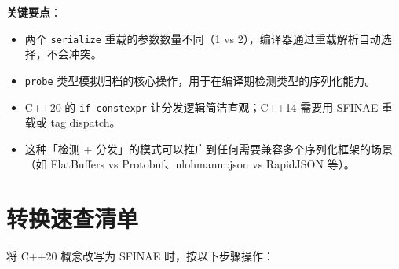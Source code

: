 \documentclass[12pt,a4paper,fontset=fandol]{ctexbook}
\begin{document}
\textbf{关键要点}：
\begin{itemize}[nosep]
  \item 两个 \texttt{serialize} 重载的参数数量不同（1 vs 2），编译器通过重载解析自动选择，不会冲突。
  \item \texttt{probe} 类型模拟归档的核心操作，用于在编译期检测类型的序列化能力。
  \item C++20 的 \texttt{if constexpr} 让分发逻辑简洁直观；C++14 需要用 SFINAE 重载或 tag dispatch。
  \item 这种「检测 + 分发」的模式可以推广到任何需要兼容多个序列化框架的场景
        （如 FlatBuffers vs Protobuf、nlohmann::json vs RapidJSON 等）。
\end{itemize}

\section{转换速查清单}

将 C++20 概念改写为 SFINAE 时，按以下步骤操作：
\end{document}

